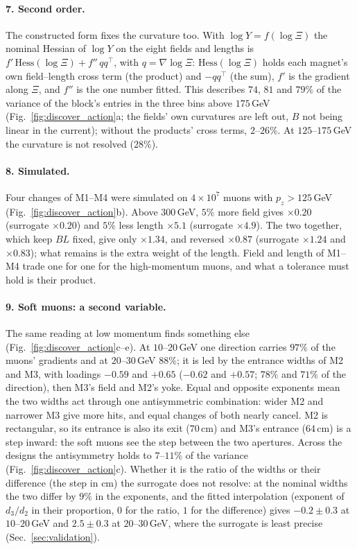 \documentclass[11pt,a4paper]{article}
\begin{document}
\paragraph{7. Second order.}
The constructed form fixes the curvature too. With $\log Y=f(\log\Xi)$ the nominal Hessian of
$\log Y$ on the eight fields and lengths is
$f'\,\mathrm{Hess}(\log\Xi)+f''\,qq^\top$, with $q=\nabla\log\Xi$: $\mathrm{Hess}(\log\Xi)$
holds each magnet's own field--length cross term (the product) and $-qq^\top$ (the sum), $f'$ is
the gradient along $\Xi$, and $f''$ is the one number fitted. This describes $74$, $81$ and $79\%$
of the variance of the block's entries in the three bins above $175$\,GeV
(Fig.~\ref{fig:discover_action}a; the fields' own curvatures are left out, $B$ not being linear in
the current); without the products' cross terms, $2$--$26\%$. At $125$--$175$\,GeV the curvature
is not resolved ($28\%$).

\paragraph{8. Simulated.}
Four changes of M1--M4 were simulated on $4\times10^7$ muons with $p_z>125$\,GeV
(Fig.~\ref{fig:discover_action}b). Above $300$\,GeV, $5\%$ more field gives $\times0.20$
(surrogate $\times0.20$) and $5\%$ less length $\times5.1$ (surrogate $\times4.9$). The two
together, which keep $BL$ fixed, give only $\times1.34$, and reversed $\times0.87$ (surrogate
$\times1.24$ and $\times0.83$); what remains is the extra weight of the length. Field and length
of M1--M4 trade one for one for the high-momentum muons, and what a tolerance must hold is their
product.

\paragraph{9. Soft muons: a second variable.}
The same reading at low momentum finds something else (Fig.~\ref{fig:discover_action}c--e). At
$10$--$20$\,GeV one direction carries $97\%$ of the muons' gradients and at $20$--$30$\,GeV
$88\%$; it is led by the entrance widths of M2 and M3, with loadings $-0.59$ and $+0.65$
($-0.62$ and $+0.57$; $78\%$ and $71\%$ of the direction), then M3's field and M2's yoke. Equal and
opposite exponents mean the two widths act through one antisymmetric combination: wider M2 and
narrower M3 give more hits, and equal changes of both nearly cancel. M2 is rectangular, so its
entrance is also its exit ($70$\,cm) and M3's entrance ($64$\,cm) is a step inward: the soft
muons see the step between the two apertures. Across the designs the antisymmetry holds to
$7$--$11\%$ of the variance (Fig.~\ref{fig:discover_action}c). Whether it is the ratio of the
widths or their difference (the step in cm) the surrogate does not resolve: at the nominal
widths the two differ by $9\%$ in the exponents, and the fitted interpolation (exponent of
$d_3/d_2$ in their proportion, $0$ for the ratio, $1$ for the difference) gives $-0.2\pm0.3$ at
$10$--$20$\,GeV and $2.5\pm0.3$ at $20$--$30$\,GeV, where the surrogate is least precise
(Sec.~\ref{sec:validation}).
\end{document}
